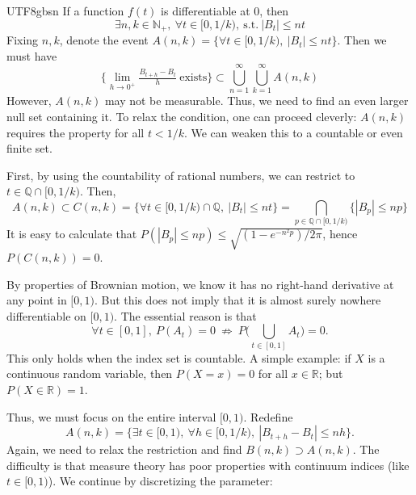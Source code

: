 \documentclass{article}
\begin{document}
\begin{CJK*}{UTF8}{gbsn}
{If a function $f(t)$ is differentiable at $0$, then}
$$
\exists n,k\in \mathbb{N}_+,\ \forall t\in[0,1/k),\ \text{s.t.}\ |B_t|\le nt
$$
{Fixing $n,k$, denote the event $A(n,k)=\{\forall t\in[0,1/k),\ |B_t|\le nt\}$. Then we must have}
$$
\{\lim_{h\to0^+} \tfrac{B_{t+h}-B_t}{h}\ \text{exists}\}\subset
\bigcup_{n=1}^\infty\bigcup_{k=1}^\infty A(n,k)
$$
{However, $A(n,k)$ may not be measurable. Thus, we need to find an even larger null set containing it.} To relax the condition, one can proceed cleverly: {$A(n,k)$ requires the property for all $t<1/k$.} We can weaken this to a countable or even finite set.

First, by using the countability of rational numbers, we can restrict to $t\in \mathbb{Q}\cap[0,1/k)$. Then,
$$
A(n,k)\subset C(n,k)=\{\forall t\in[0,1/k)\cap \mathbb{Q},\ |B_t|\le nt\}
=\bigcap_{p\in \mathbb{Q}\cap[0,1/k)}\{|B_p|\le np\}
$$
It is easy to calculate that $P(|B_p|\le np)\le\sqrt{(1-e^{-n^2p})/2\pi}$, hence $P(C(n,k))=0$.

By properties of Brownian motion, we know it has no right-hand derivative at any point in $[0,1)$. But this does not imply that it is almost surely nowhere differentiable on $[0,1)$. The essential reason is that
$$
\forall t\in[0,1],\ P(A_t)=0\ \not\Rightarrow\ P\big(\bigcup_{t\in[0,1]}A_t\big)=0.
$$
This only holds when the index set is countable. A simple example: if $X$ is a continuous random variable, then $P(X=x)=0$ for all $x\in\mathbb{R}$; but $P(X\in\mathbb{R})=1$.

Thus, we must focus on the entire interval $[0,1)$. Redefine
$$
A(n,k)=\{\exists t\in[0,1),\ \forall h\in[0,1/k),\ |B_{t+h}-B_t|\le nh\}.
$$
Again, we need to relax the restriction and find $B(n,k)\supset A(n,k)$. The difficulty is that measure theory has poor properties with continuum indices (like $t\in[0,1)$). We continue by discretizing the parameter:


\end{CJK*}
\end{document}
